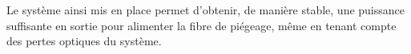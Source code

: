 Le système ainsi mis en place permet d’obtenir, de manière stable, une puissance suffisante en sortie pour alimenter la fibre de piégeage, même en tenant compte des pertes optiques du système.



%
%
%
